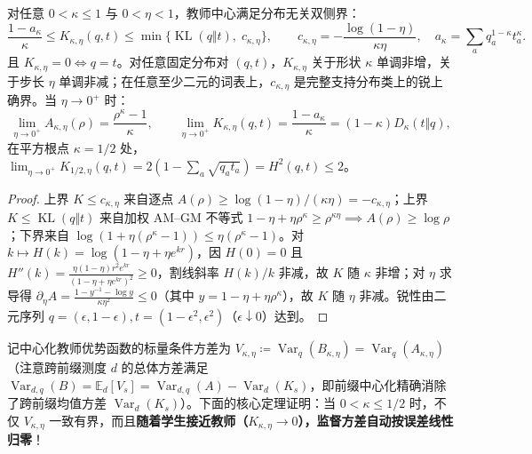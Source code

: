 \documentclass[lang=cn,scheme=chinese,openany]{elegantbook}
\newcommand{\E}{\mathbb E}
\newcommand{\KL}{\operatorname{KL}}
\newcommand{\Var}{\operatorname{Var}}
\begin{document}
\begin{theorem}
\label{thm:center-bounds-monotonicity}
对任意 $0<\kappa\le 1$ 与 $0<\eta<1$，教师中心满足分布无关双侧界：
\begin{equation}
 \frac{1-a_\kappa}{\kappa}\le K_{\kappa,\eta}(q,t)
 \le\min\bigl\{\KL(q\Vert t),\; c_{\kappa,\eta}\bigr\},
 \qquad c_{\kappa,\eta}=-\frac{\log(1-\eta)}{\kappa\eta},\quad a_\kappa=\sum_a q_a^{1-\kappa}t_a^\kappa.
 \label{eq:center-uniform-cap}
\end{equation}
且 $K_{\kappa,\eta}=0\Longleftrightarrow q=t$。对任意固定分布对 $(q,t)$，$K_{\kappa,\eta}$ 关于形状 $\kappa$ 单调非增，关于步长 $\eta$ 单调非减；在任意至少二元的词表上，$c_{\kappa,\eta}$ 是完整支持分布类上的锐上确界。当 $\eta\to 0^+$ 时：
\begin{equation}
 \lim_{\eta\to 0^+}A_{\kappa,\eta}(\rho)=\frac{\rho^\kappa-1}{\kappa},\qquad
 \lim_{\eta\to 0^+}K_{\kappa,\eta}(q,t)=\frac{1-a_\kappa}{\kappa}=(1-\kappa)D_\kappa(t\Vert q),
 \label{eq:divergence-map-center-limit,eq:center-small-step-limit}
\end{equation}
在平方根点 $\kappa=1/2$ 处，$\lim_{\eta\to 0^+}K_{1/2,\eta}(q,t)=2(1-\sum_a\sqrt{q_a t_a})=H^2(q,t)\le 2$。
\end{theorem}
\begin{proof}
上界 $K\le c_{\kappa,\eta}$ 来自逐点 $A(\rho)\ge\log(1-\eta)/(\kappa\eta)=-c_{\kappa,\eta}$；上界 $K\le\KL(q\Vert t)$ 来自加权 AM--GM 不等式 $1-\eta+\eta\rho^\kappa\ge\rho^{\kappa\eta}\implies A(\rho)\ge\log\rho$；下界来自 $\log(1+\eta(\rho^\kappa-1))\le\eta(\rho^\kappa-1)$。对 $k\mapsto H(k)=\log(1-\eta+\eta e^{kr})$，因 $H(0)=0$ 且 $H''(k)=\frac{\eta(1-\eta)r^2 e^{kr}}{(1-\eta+\eta e^{kr})^2}\ge 0$，割线斜率 $H(k)/k$ 非减，故 $K$ 随 $\kappa$ 非增；对 $\eta$ 求导得 $\partial_\eta A=\frac{1-y^{-1}-\log y}{\kappa\eta^2}\le 0$（其中 $y=1-\eta+\eta\rho^\kappa$），故 $K$ 随 $\eta$ 非减。锐性由二元序列 $q=(\epsilon,1-\epsilon), t=(1-\epsilon^2,\epsilon^2)$（$\epsilon\downarrow 0$）达到。
\end{proof}

记中心化教师优势函数的标量条件方差为 $V_{\kappa,\eta}\coloneqq\Var_q(B_{\kappa,\eta})=\Var_q(A_{\kappa,\eta})$（注意跨前缀测度 $d$ 的总体方差满足 $\Var_{d,q}(B)=\E_d[V_s]=\Var_{d,q}(A)-\Var_d(K_s)$，即前缀中心化精确消除了跨前缀均值方差 $\Var_d(K_s)$）。下面的核心定理证明：当 $0<\kappa\le 1/2$ 时，不仅 $V_{\kappa,\eta}$ 一致有界，而且\textbf{随着学生接近教师（$K_{\kappa,\eta}\to 0$），监督方差自动按误差线性归零}！
\end{document}
